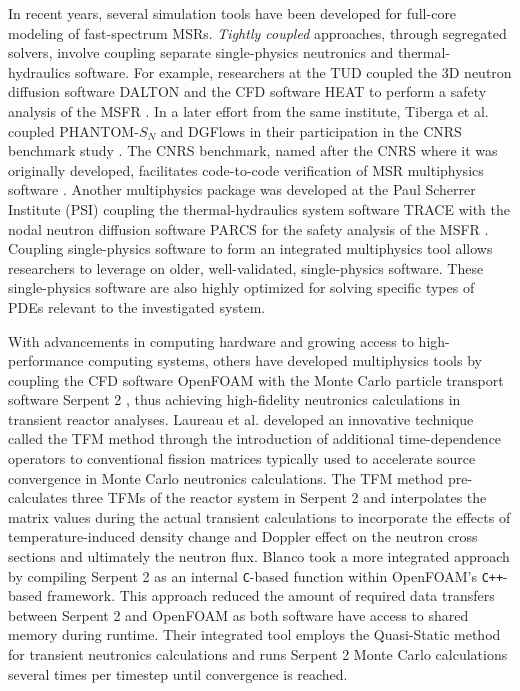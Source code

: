In recent years, several simulation tools have been developed for full-core
modeling of fast-spectrum \glspl{MSR}. \textit{Tightly coupled} approaches,
through segregated solvers, involve coupling separate single-physics neutronics
and thermal-hydraulics software. For example, researchers at
the \gls{TUD} coupled the 3D neutron diffusion software DALTON
\cite{boer_validation_2010} and the \gls{CFD} software HEAT
\cite{de_zwaan_static_2007} to perform a safety analysis of the \gls{MSFR}
\cite{fiorina_modelling_2014}. In a later effort from the same institute,
Tiberga et al. \cite{tiberga_discontinuous_2019} coupled PHANTOM-$S_N$ and
DGFlows in their participation in the CNRS benchmark study
\cite{tiberga_results_2020}. The CNRS benchmark, named after the \gls{CNRS}
where it was originally developed, facilitates code-to-code verification of
\gls{MSR} multiphysics software \cite{aufiero_testing_2018}. Another
multiphysics package was developed at the Paul Scherrer Institute (PSI)
coupling the thermal-hydraulics system software \gls{TRACE}
\cite{nrc_trace_2007} with the
nodal neutron diffusion software \gls{PARCS} \cite{downar_parcs_2010} for the
safety analysis of the \gls{MSFR} \cite{pettersen_coupled_2016}. Coupling
single-physics software to form an integrated multiphysics tool allows
researchers to leverage on older, well-validated, single-physics software.
These single-physics software are also highly optimized for solving specific
types of \glspl{PDE} relevant to the investigated system.

With advancements in computing hardware and growing access to
high-performance computing systems, others have
developed multiphysics tools by coupling the \gls{CFD} software OpenFOAM
\cite{openfoam_openfoam_2021} with the Monte Carlo particle transport software
Serpent 2 \cite{leppanen_serpent_2014}, thus achieving high-fidelity neutronics
calculations in transient reactor analyses. Laureau et al.
\cite{laureau_transient_2017} developed an innovative technique called the
\gls{TFM} method through the introduction of additional time-dependence
operators to conventional fission matrices typically used to accelerate source
convergence in Monte Carlo neutronics calculations. The \gls{TFM} method
pre-calculates three \glspl{TFM} of the reactor system in Serpent 2 and
interpolates the matrix values during the actual transient calculations to
incorporate the effects of temperature-induced density change and Doppler
effect on the neutron cross sections and ultimately the neutron flux. Blanco
\cite{blanco_neutronic_2020} took a more integrated approach by
compiling Serpent 2 as an internal \texttt{C}-based function within OpenFOAM's
\texttt{C++}-based framework. This approach reduced the amount of required data
transfers between Serpent 2 and OpenFOAM as both software have access to shared
memory during runtime. Their integrated tool employs the Quasi-Static
method for transient neutronics calculations and runs Serpent 2 Monte Carlo
calculations several times per timestep until convergence is reached.

